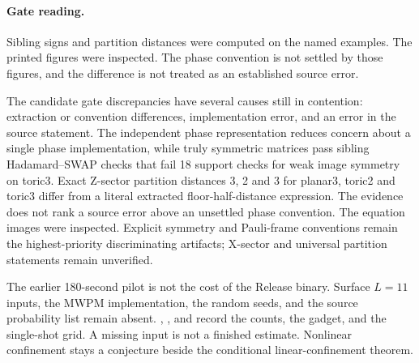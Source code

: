 \paragraph{Gate reading.} Sibling signs and partition distances were computed on the named examples. The printed figures were inspected. The phase convention is not settled by those figures, and the difference is not treated as an established source error.

The candidate gate discrepancies have several causes still in contention: extraction or convention differences, implementation error, and an error in the source statement. The independent phase representation reduces concern about a single phase implementation, while truly symmetric matrices pass sibling Hadamard--SWAP checks that fail 18 support checks for weak image symmetry on toric3. Exact Z-sector partition distances 3, 2 and 3 for planar3, toric2 and toric3 differ from a literal extracted floor-half-distance expression. The evidence does not rank a source error above an unsettled phase convention. The equation images were inspected. Explicit symmetry and Pauli-frame conventions remain the highest-priority discriminating artifacts; X-sector and universal partition statements remain unverified.

The earlier 180-second pilot is not the cost of the Release binary. Surface $L=11$ inputs, the MWPM implementation, the random seeds, and the source probability list remain absent. \href{https://github.com/alectionary/vibe-math/blob/master/formalization/quintavalle-hgp/results/reshape_cost.json}{}, \href{https://github.com/alectionary/vibe-math/blob/master/formalization/quintavalle-hgp/results/noisy_injection.json}{}, and \href{https://github.com/alectionary/vibe-math/blob/master/formalization/quintavalle-hgp/results/production_grid.json}{} record the counts, the gadget, and the single-shot grid. A missing input is not a finished estimate. Nonlinear confinement stays a conjecture beside the conditional linear-confinement theorem.

